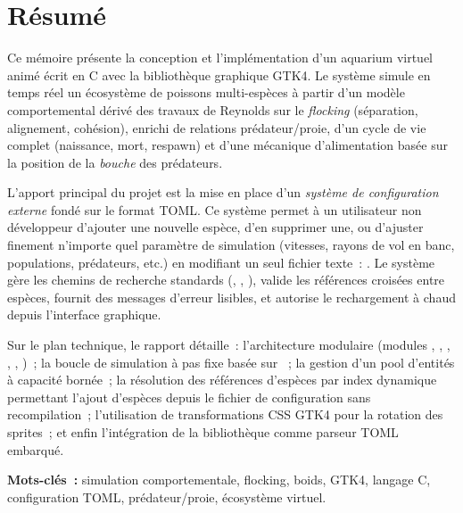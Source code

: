 
\chapter*{Résumé}

Ce mémoire présente la conception et l'implémentation d'un aquarium virtuel
animé écrit en C avec la bibliothèque graphique GTK4. Le système simule en
temps réel un écosystème de poissons multi-espèces à partir d'un modèle
comportemental dérivé des travaux de Reynolds sur le \emph{flocking}
(séparation, alignement, cohésion), enrichi de relations prédateur/proie,
d'un cycle de vie complet (naissance, mort, respawn) et d'une mécanique
d'alimentation basée sur la position de la \emph{bouche} des prédateurs.

L'apport principal du projet est la mise en place d'un \emph{système de
configuration externe} fondé sur le format TOML. Ce système permet à un
utilisateur non développeur d'ajouter une nouvelle espèce, d'en supprimer
une, ou d'ajuster finement n'importe quel paramètre de simulation
(vitesses, rayons de vol en banc, populations, prédateurs, etc.) en
modifiant un seul fichier texte~: . Le système
gère les chemins de recherche standards (, ,
), valide les références croisées entre espèces, fournit des
messages d'erreur lisibles, et autorise le rechargement à chaud
depuis l'interface graphique.

Sur le plan technique, le rapport détaille~: l'architecture modulaire
(modules , , , , ,
)~; la boucle de simulation à pas fixe basée sur
~; la gestion d'un pool d'entités à capacité bornée~;
la résolution des références d'espèces par index dynamique permettant
l'ajout d'espèces depuis le fichier de configuration sans recompilation~;
l'utilisation de transformations CSS GTK4 pour la rotation des sprites~;
et enfin l'intégration de la bibliothèque  comme parseur
TOML embarqué.

\textbf{Mots-clés~:} simulation comportementale, flocking, boids,
GTK4, langage C, configuration TOML, prédateur/proie, écosystème virtuel.

\tableofcontents

\listoffigures

\listoftables

\listoflistings
